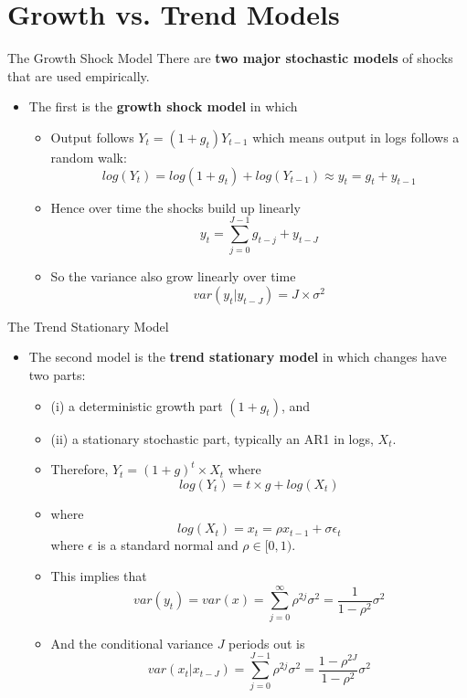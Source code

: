 \documentclass[10pt,c,aspectratio=1610,handout]{beamer}
\begin{document}
\section{Growth vs. Trend Models}
\begin{frame}{The Growth Shock Model}%
  There are \textbf{two major stochastic models} of shocks that are used empirically.%
  \pause%
  \begin{itemize}%
    \item[$\blacktriangleright$] The first is the \textbf{growth shock model} in which%
    \begin{itemize}%
      \item[$\rightarrow$] Output follows $Y_t = (1+g_t)Y_{t-1}$  which means output in logs follows a random walk: \[ log(Y_t) = log(1+g_t) + log(Y_{t-1}) \approx y_t = g_t + y_{t-1} \]%
      \pause%
	    \item[$\rightarrow$] Hence over time the shocks build up linearly \[ y_t = \sum_{j=0}^{J-1} g_{t-j} + y_{t-J} \]%
	    \pause%
	    \item[$\rightarrow$] So the variance also grow linearly over time \[ var(y_t|y_{t-J}) = J \times \sigma^2 \]%
    \end{itemize}%
  \end{itemize}%
\end{frame}%
\begin{frame}{The Trend Stationary Model}%
  \begin{itemize}%
    \item[$\blacktriangleright$] The second model is the \textbf{trend stationary model} in which changes have two parts:%
    \pause%
    \begin{itemize}%
      \item[$\rightarrow$] (i) a deterministic growth part $(1+g_t)$, and%
      \pause%
      \item[$\rightarrow$] (ii) a stationary stochastic part, typically an AR1 in logs, $X_t$.%
      \item[$\rightarrow$] Therefore, $Y_t = (1+g)^t \times X_t$ where \[ log(Y_t) = t \times g + log(X_t) \]%
      \item[$\rightarrow$] where \[ log(X_t) =x_t = \rho x_{t-1} + \sigma \epsilon_t \] where $\epsilon$ is a standard normal and $\rho \in [0,1)$.%
      \pause%
      \item[$\rightarrow$] This implies that \[ var(y_t) = var(x) = \sum_{j=0}^{\infty}\rho^{2j}  \sigma^2 = \frac{1}{1-\rho^2} \sigma^2 \]%
      \pause%
      \item[$\rightarrow$] And the conditional variance $J$ periods out is \[ var(x_t|x_{t-J}) = \sum_{j=0}^{J-1}\rho^{2j}  \sigma^2 = \frac{1-\rho^{2J}}{1-\rho^2} \sigma^2 \]%
    \end{itemize}%
  \end{itemize}%
\end{frame}%
\end{document}
